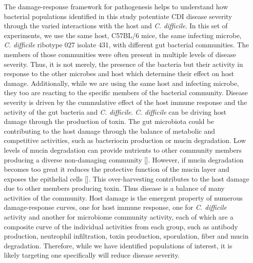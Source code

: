 \documentclass[
  12pt,
]{article}
\begin{document}
The damage-response framework for pathogenesis helps to understand how
bacterial populations identified in this study potentiate CDI disease
severity through the varied interactions with the host and \emph{C.
difficile}. In this set of experiments, we use the same host, C57BL/6
mice, the same infecting microbe, \emph{C. difficile} ribotype 027
isolate 431, with different gut bacterial communities. The members of
those communities were often present in multiple levels of disease
severity. Thus, it is not merely, the presence of the bacteria but their
activity in response to the other microbes and host which determine
their effect on host damage. Additionally, while we are using the same
host and infecting microbe, they too are reacting to the specific
members of the bacterial community. Disease severity is driven by the
cummulative effect of the host immune response and the activity of the
gut bacteria and \emph{C. difficile}. \emph{C. difficile} can be driving
host damage through the production of toxin. The gut microbiota could be
contributing to the host damage through the balance of metabolic and
competitive activities, such as bacteriocin production or mucin
degradation. Low levels of mucin degradation can provide nutrients to
other community members producing a diverse non-damaging community
{[}{]}. However, if mucin degradation becomes too great it reduces the
protective function of the mucin layer and exposes the epithelial cells
{[}{]}. This over-harvesting contributes to the host damage due to other
members producing toxin. Thus disease is a balance of many activities of
the community. Host damage is the emergent property of numerous
damage-response curves, one for host immune response, one for \emph{C.
difficile} activity and another for microbiome community activity, each
of which are a composite curve of the individual activities from each
group, such as antibody production, neutrophil infiltration, toxin
production, sporulation, fiber and mucin degradation. Therefore, while
we have identified populations of interest, it is likely targeting one
specifically will reduce disease severity.
\end{document}
